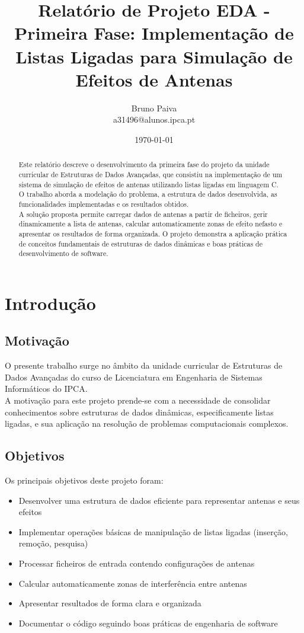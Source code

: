 \documentclass[a4paper,12pt]{article}
\title{Relatório de Projeto EDA - Primeira Fase: Implementação de Listas Ligadas para Simulação de Efeitos de Antenas}
\author{Bruno Paiva \\ a31496@alunos.ipca.pt}
\date{\today}
\begin{document}
\maketitle

\newpage
\begin{abstract}
    Este relatório descreve o desenvolvimento da primeira fase do projeto da unidade curricular de Estruturas de Dados Avançadas, que consistiu na implementação de um sistema de simulação de efeitos de antenas utilizando listas ligadas em linguagem C.\\
    O trabalho aborda a modelação do problema, a estrutura de dados desenvolvida, as funcionalidades implementadas e os resultados obtidos.\\
    A solução proposta permite carregar dados de antenas a partir de ficheiros, gerir dinamicamente a lista de antenas, calcular automaticamente zonas de efeito nefasto e apresentar os resultados de forma organizada. O projeto demonstra a aplicação prática de conceitos fundamentais de estruturas de dados dinâmicas e boas práticas de desenvolvimento de software.
    \end{abstract}
\newpage
\tableofcontents
\newpage

\section{Introdução}
\subsection{Motivação}
O presente trabalho surge no âmbito da unidade curricular de Estruturas de Dados Avançadas do curso de Licenciatura em Engenharia de Sistemas Informáticos do IPCA.\\
A motivação para este projeto prende-se com a necessidade de consolidar conhecimentos sobre estruturas de dados dinâmicas, especificamente listas ligadas, e sua aplicação na resolução de problemas computacionais complexos.

\subsection{Objetivos}
Os principais objetivos deste projeto foram:
\begin{itemize}
    \item Desenvolver uma estrutura de dados eficiente para representar antenas e seus efeitos
    \item Implementar operações básicas de manipulação de listas ligadas (inserção, remoção, pesquisa)
    \item Processar ficheiros de entrada contendo configurações de antenas
    \item Calcular automaticamente zonas de interferência entre antenas
    \item Apresentar resultados de forma clara e organizada
    \item Documentar o código seguindo boas práticas de engenharia de software
\end{itemize}
\end{document}

